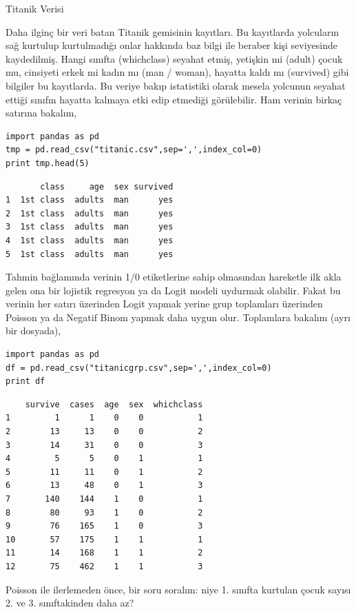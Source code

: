\documentclass[12pt,fleqn]{article}\usepackage{../../common}
\begin{document}
Titanik Verisi 

Daha ilginç bir veri batan Titanik gemisinin kayıtları. Bu kayıtlarda
yolcuların sağ kurtulup kurtulmadığı onlar hakkında baz bilgi ile beraber
kişi seviyesinde kaydedilmiş. Hangi sınıfta (whichclass) seyahat etmiş,
yetişkin mi (adult) çocuk mu, cinsiyeti erkek mi kadın mı (man / woman),
hayatta kaldı mı (survived) gibi bilgiler bu kayıtlarda. Bu veriye bakıp
istatistiki olarak mesela yolcunun seyahat ettiği sınıfın hayatta kalmaya
etki edip etmediği görülebilir. Ham verinin birkaç satırına bakalım,

\begin{verbatim}
import pandas as pd
tmp = pd.read_csv("titanic.csv",sep=',',index_col=0)
print tmp.head(5)
\end{verbatim}

\begin{verbatim}
       class     age  sex survived
1  1st class  adults  man      yes
2  1st class  adults  man      yes
3  1st class  adults  man      yes
4  1st class  adults  man      yes
5  1st class  adults  man      yes
\end{verbatim}

Tahmin bağlamında verinin 1/0 etiketlerine sahip olmasından hareketle ilk
akla gelen ona bir lojistik regresyon ya da Logit modeli uydurmak
olabilir. Fakat bu verinin her satırı üzerinden Logit yapmak yerine grup
toplamları üzerinden Poisson ya da Negatif Binom yapmak daha uygun
olur. Toplamlara bakalım (ayrı bir dosyada),

\begin{verbatim}
import pandas as pd
df = pd.read_csv("titanicgrp.csv",sep=',',index_col=0)
print df
\end{verbatim}

\begin{verbatim}
    survive  cases  age  sex  whichclass
1         1      1    0    0           1
2        13     13    0    0           2
3        14     31    0    0           3
4         5      5    0    1           1
5        11     11    0    1           2
6        13     48    0    1           3
7       140    144    1    0           1
8        80     93    1    0           2
9        76    165    1    0           3
10       57    175    1    1           1
11       14    168    1    1           2
12       75    462    1    1           3
\end{verbatim}

Poisson ile ilerlemeden önce, bir soru soralım: niye 1. sınıfta kurtulan
çocuk sayısı 2. ve 3. sınıftakinden daha az?
\end{document}
